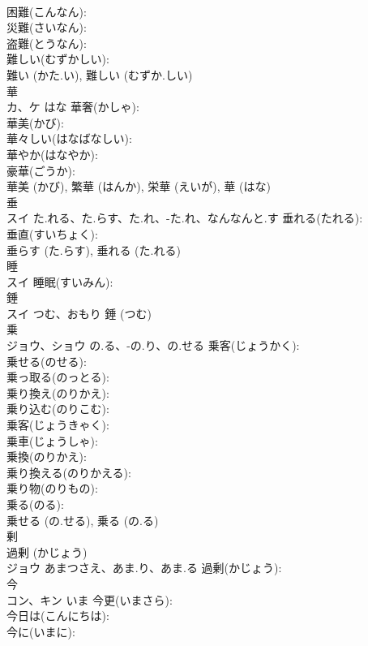 \documentclass[8pt]{extreport}
\begin{document}
\begin{CJK}{UTF8}{min}
\\	困難(こんなん): 
\\	災難(さいなん): 
\\	盗難(とうなん): 
\\	難しい(むずかしい): 
\\	難い (かた.い), 難しい (むずか.しい)
\\	華			
\\	カ、ケ	はな	華奢(かしゃ): 
\\	華美(かび): 
\\	華々しい(はなばなしい): 
\\	華やか(はなやか): 
\\	豪華(ごうか): 
\\	華美 (かび), 繁華 (はんか), 栄華 (えいが), 華 (はな)
\\	垂			
\\	スイ	た.れる、た.らす、た.れ、-た.れ、なんなんと.す	垂れる(たれる): 
\\	垂直(すいちょく): 
\\	垂らす (た.らす), 垂れる (た.れる)
\\	睡			
\\	スイ		睡眠(すいみん): 
\\	錘			
\\	スイ	つむ、おもり		錘 (つむ)
\\	乗			
\\	ジョウ、ショウ	の.る、-の.り、の.せる	乗客(じょうかく): 
\\	乗せる(のせる): 
\\	乗っ取る(のっとる): 
\\	乗り換え(のりかえ): 
\\	乗り込む(のりこむ): 
\\	乗客(じょうきゃく): 
\\	乗車(じょうしゃ): 
\\	乗換(のりかえ): 
\\	乗り換える(のりかえる): 
\\	乗り物(のりもの): 
\\	乗る(のる): 
\\	乗せる (の.せる), 乗る (の.る)
\\	剰			
\\	過剰 (かじょう) 
\\	ジョウ	あまつさえ、あま.り、あま.る	過剰(かじょう): 
\\	今			
\\	コン、キン	いま	今更(いまさら): 
\\	今日は(こんにちは): 
\\	今に(いまに): 

\end{CJK}
\end{document}

